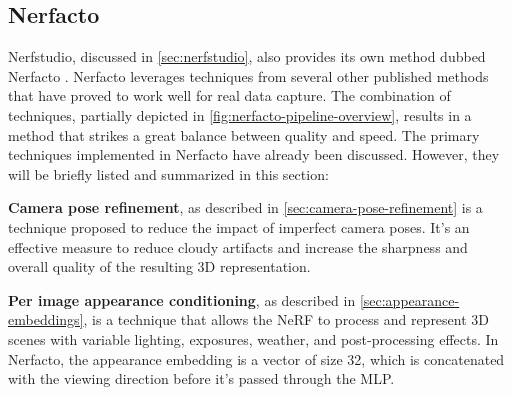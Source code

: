 


\subsection{Nerfacto} \label{sec:nerfacto}
Nerfstudio, discussed in \autoref{sec:nerfstudio}, also provides its own method dubbed Nerfacto \cite{nerfstudio}. Nerfacto leverages techniques from several other published methods that have proved to work well for real data capture. The combination of techniques, partially depicted in \autoref{fig:nerfacto-pipeline-overview}, results in a method that strikes a great balance between quality and speed. 
The primary techniques implemented in Nerfacto have already been discussed. However, they will be briefly listed and summarized in this section:



\textbf{Camera pose refinement}, as described in \autoref{sec:camera-pose-refinement} is a technique proposed to reduce the impact of imperfect camera poses. It's an effective measure to reduce cloudy artifacts and increase the sharpness and overall quality of the resulting 3D representation.

\textbf{Per image appearance conditioning}, as described in \autoref{sec:appearance-embeddings}, is a technique that allows the NeRF to process and represent 3D scenes with variable lighting, exposures, weather, and post-processing effects. In Nerfacto, the appearance embedding is a vector of size 32, which is concatenated with the viewing direction before it's passed through the MLP.

